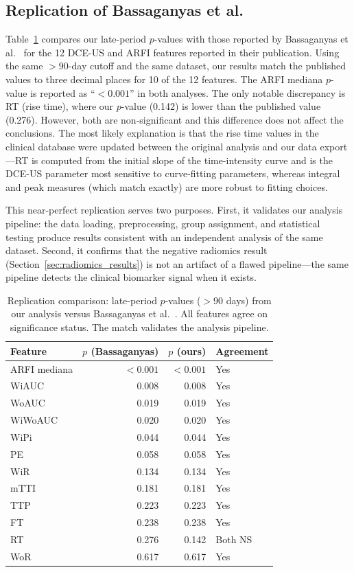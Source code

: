 \subsection{Replication of Bassaganyas et al.}

Table~\ref{tab:replication} compares our late-period $p$-values with those reported by Bassaganyas et al.\ \cite{bassaganyas2025} for the 12 DCE-US and ARFI features reported in their publication. Using the same $> 90$-day cutoff and the same dataset, our results match the published values to three decimal places for 10 of the 12 features. The ARFI mediana $p$-value is reported as ``$< 0.001$'' in both analyses. The only notable discrepancy is RT (rise time), where our $p$-value (0.142) is lower than the published value (0.276). However, both are non-significant and this difference does not affect the conclusions. The most likely explanation is that the rise time values in the clinical database were updated between the original analysis and our data export---RT is computed from the initial slope of the time-intensity curve and is the DCE-US parameter most sensitive to curve-fitting parameters, whereas integral and peak measures (which match exactly) are more robust to fitting choices.

This near-perfect replication serves two purposes. First, it validates our analysis pipeline: the data loading, preprocessing, group assignment, and statistical testing produce results consistent with an independent analysis of the same dataset. Second, it confirms that the negative radiomics result (Section~\ref{sec:radiomics_results}) is not an artifact of a flawed pipeline---the same pipeline detects the clinical biomarker signal when it exists.

\begin{table}[ht]
\centering
\caption{Replication comparison: late-period $p$-values ($> 90$ days) from our analysis versus Bassaganyas et al.\ \cite{bassaganyas2025}. All features agree on significance status. The match validates the analysis pipeline.}
\label{tab:replication}
\begin{tabular}{lrrl}
\toprule
Feature & $p$ (Bassaganyas) & $p$ (ours) & Agreement \\
\midrule
ARFI mediana & $< 0.001$ & $< 0.001$ & Yes \\
WiAUC & 0.008 & 0.008 & Yes \\
WoAUC & 0.019 & 0.019 & Yes \\
WiWoAUC & 0.020 & 0.020 & Yes \\
WiPi & 0.044 & 0.044 & Yes \\
PE & 0.058 & 0.058 & Yes \\
WiR & 0.134 & 0.134 & Yes \\
mTTI & 0.181 & 0.181 & Yes \\
TTP & 0.223 & 0.223 & Yes \\
FT & 0.238 & 0.238 & Yes \\
RT & 0.276 & 0.142 & Both NS \\
WoR & 0.617 & 0.617 & Yes \\
\bottomrule
\end{tabular}
\end{table}

